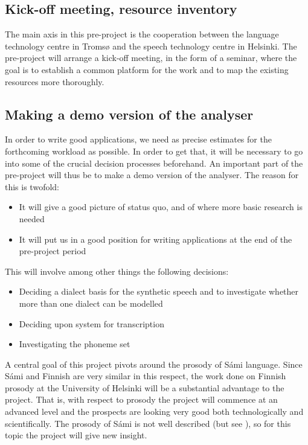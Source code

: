 \documentclass[a4paper,english]{article}
\begin{document}
\subsection{Kick-off meeting, resource inventory}

The main axis in this pre-project is the cooperation between the language technology centre in Tromsø and the speech technology centre in Helsinki. The pre-project will arrange a kick-off meeting, in the form of a seminar, where the goal is to establish a common platform for the work and to map the existing resources more thoroughly.

\subsection{Making a demo version of the analyser}

In order to write good applications, we need as precise estimates for the forthcoming workload as possible. In order to get that, it will be necessary to go into some of the crucial decision processes beforehand. An important part of the pre-project will thus be to make a demo version of the analyser. The reason for this is twofold:

\begin{itemize}
\item It will give a good picture of status quo, and of where more basic research is needed
\item It will put us in a good position for writing applications at the end of the pre-project period
\end{itemize}

This will involve among other things the following decisions:

\begin{itemize}
\item {Deciding a dialect basis for the synthetic speech and to investigate whether more than one dialect can be modelled}
\item {Deciding upon system for transcription}
\item {Investigating the phoneme set}
\end{itemize}

A central goal of this project pivots around the prosody of Sámi language.  Since Sámi and Finnish are very similar in this respect, the work done on Finnish prosody at the University of Helsinki will be a substantial advantage to the project.  That is, with respect to prosody the project will commence at an advanced level and the prospects are looking very good both technologically and scientifically. The prosody of Sámi is not well described (but see \cite{RIEPMO84}), so for this topic the project will give new insight.
\end{document}
